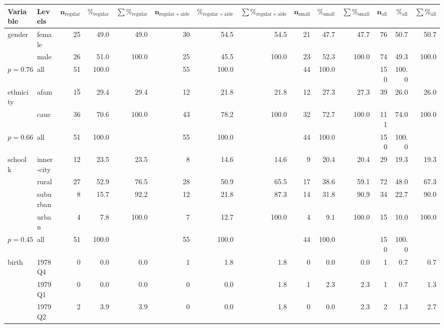 \documentclass[doc]{apa6}\usepackage[]{graphicx}\usepackage[]{color}
\begin{document}
\begin{landscape}
\clearpage
{\footnotesize
\begin{longtable}{ll|rrr|rrr|rrr|rrr}
 \textbf{Variable} & \textbf{Levels} & $\mathbf{n_{\mathrm{regular}}}$ & $\mathbf{\%_{\mathrm{regular}}}$ & $\mathbf{\sum \%_{\mathrm{regular}}}$ & $\mathbf{n_{\mathrm{regular+aide}}}$ & $\mathbf{\%_{\mathrm{regular+aide}}}$ & $\mathbf{\sum \%_{\mathrm{regular+aide}}}$ & $\mathbf{n_{\mathrm{small}}}$ & $\mathbf{\%_{\mathrm{small}}}$ & $\mathbf{\sum \%_{\mathrm{small}}}$ & $\mathbf{n_{\mathrm{all}}}$ & $\mathbf{\%_{\mathrm{all}}}$ & $\mathbf{\sum \%_{\mathrm{all}}}$ \\ 
  \hline
gender & female & 25 & 49.0 & 49.0 & 30 & 54.5 & 54.5 & 21 & 47.7 & 47.7 & 76 & 50.7 & 50.7 \\ 
   & male & 26 & 51.0 & 100.0 & 25 & 45.5 & 100.0 & 23 & 52.3 & 100.0 & 74 & 49.3 & 100.0 \\ 
   \hline
$p= 0.76$ & all & 51 & 100.0 &  & 55 & 100.0 &  & 44 & 100.0 &  & 150 & 100.0 &  \\ 
   \hline
\hline
ethnicity & afam & 15 & 29.4 & 29.4 & 12 & 21.8 & 21.8 & 12 & 27.3 & 27.3 & 39 & 26.0 & 26.0 \\ 
   & cauc & 36 & 70.6 & 100.0 & 43 & 78.2 & 100.0 & 32 & 72.7 & 100.0 & 111 & 74.0 & 100.0 \\ 
   \hline
$p= 0.66$ & all & 51 & 100.0 &  & 55 & 100.0 &  & 44 & 100.0 &  & 150 & 100.0 &  \\ 
   \hline
\hline
schoolk & inner-city & 12 & 23.5 & 23.5 & 8 & 14.6 & 14.6 & 9 & 20.4 & 20.4 & 29 & 19.3 & 19.3 \\ 
   & rural & 27 & 52.9 & 76.5 & 28 & 50.9 & 65.5 & 17 & 38.6 & 59.1 & 72 & 48.0 & 67.3 \\ 
   & suburban & 8 & 15.7 & 92.2 & 12 & 21.8 & 87.3 & 14 & 31.8 & 90.9 & 34 & 22.7 & 90.0 \\ 
   & urban & 4 & 7.8 & 100.0 & 7 & 12.7 & 100.0 & 4 & 9.1 & 100.0 & 15 & 10.0 & 100.0 \\ 
   \hline
$p= 0.45$ & all & 51 & 100.0 &  & 55 & 100.0 &  & 44 & 100.0 &  & 150 & 100.0 &  \\ 
   \hline
\hline
birth & 1978 Q4 & 0 & 0.0 & 0.0 & 1 & 1.8 & 1.8 & 0 & 0.0 & 0.0 & 1 & 0.7 & 0.7 \\ 
   & 1979 Q1 & 0 & 0.0 & 0.0 & 0 & 0.0 & 1.8 & 1 & 2.3 & 2.3 & 1 & 0.7 & 1.3 \\ 
   & 1979 Q2 & 2 & 3.9 & 3.9 & 0 & 0.0 & 1.8 & 0 & 0.0 & 2.3 & 2 & 1.3 & 2.7 \\ 

\end{longtable}}
\end{landscape}
\end{document}
